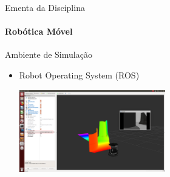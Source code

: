 \documentclass[aspectratio=169]{beamer}
\begin{document}
\begin{frame}[t]{Ementa da Disciplina}
	\framesubtitle{Robótica Móvel}
	\begin{block}{Ambiente de Simulação}
	\end{block}

	\begin{itemize}
		\item  Robot Operating System (ROS)
		      \begin{center}
			      \includegraphics[width=0.5\textwidth]{./images/ros_example_2.png}
		      \end{center}
	\end{itemize}
\end{frame}
\end{document}
